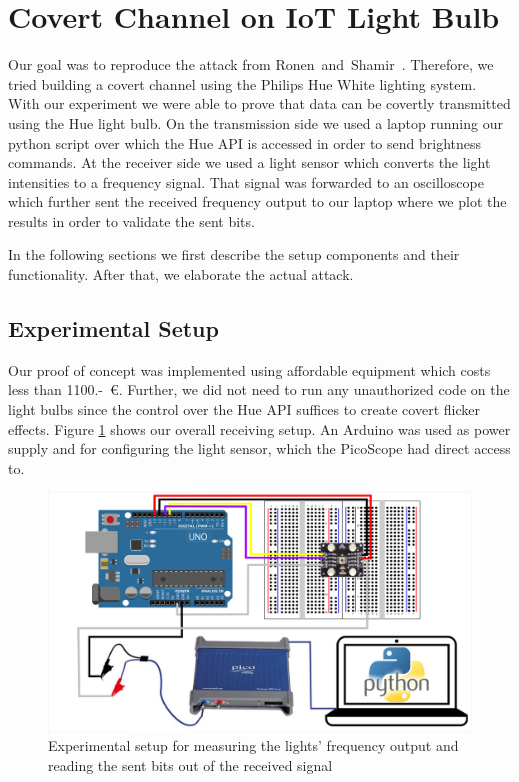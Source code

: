 \section{Covert Channel on IoT Light Bulb} %
\label{sec:experiment}
Our goal was to reproduce the attack from Ronen~and~Shamir~\cite{Ronen:2016:EFAIDCSL}.
Therefore, we tried building a covert channel using the Philips Hue White lighting system. With our experiment we were able to prove that data can be covertly transmitted using the Hue light bulb. 
On the transmission side we used a laptop running our python script over which the Hue API is accessed in order to send brightness commands.
At the receiver side we used a light sensor which converts the light intensities to a frequency signal. That signal was forwarded to an oscilloscope which further sent the received frequency output to our laptop where we plot the results in order to validate the sent bits.

In the following sections we first describe the setup components and their functionality. After that, we elaborate the actual attack.\newline

\subsection{Experimental Setup} %
\label{sec:setup}


Our proof of concept was implemented using affordable equipment which costs less than 1100.-~\euro. Further, we did not need to run any unauthorized code on the light bulbs since the control over the Hue API suffices to create covert flicker effects. 
Figure \ref{fig:setup} shows our overall receiving setup. An Arduino was used as power supply and for configuring the light sensor, which the PicoScope had direct access to.
\begin{figure}[h]
	\centering
	\includegraphics[width=14cm]{img/experimental-setup_overview.png}
	\caption{Experimental setup for measuring the lights' frequency output and reading the sent bits out of the received signal}
	\label{fig:setup}
\end{figure}

